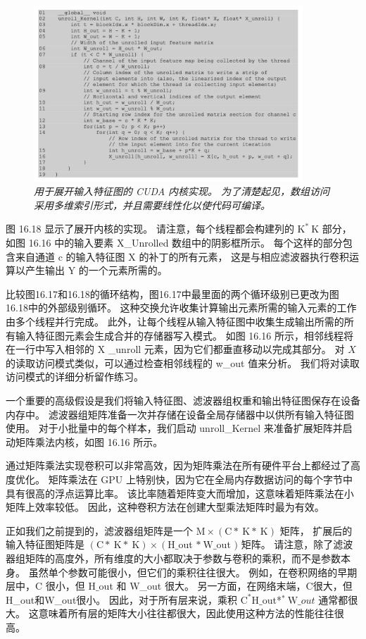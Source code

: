 \begin{figure}[H]
	\centering
	\includegraphics[width=0.9\textwidth]{figs/F16.18.png}
	\caption{\textit{用于展开输入特征图的 CUDA 内核实现。 
	为了清楚起见，数组访问采用多维索引形式，并且需要线性化以使代码可编译。}}
\end{figure}

图 16.18 显示了展开内核的实现。 请注意，每个线程都会构建列的 $\mathrm{K}^{*} \mathrm{~K}$ 部分，
如图 16.16 中的输入要素 X\_Unrolled 数组中的阴影框所示。 
每个这样的部分包含来自通道 $\mathrm{c}$ 的输入特征图 $\mathrm{X}$ 的补丁的所有元素，
这是与相应滤波器执行卷积运算以产生输出 Y 的一个元素所需的。

比较图16.17和16.18的循环结构，图16.17中最里面的两个循环级别已更改为图16.18中的外部级别循环。 
这种交换允许收集计算输出元素所需的输入元素的工作由多个线程并行完成。 
此外，让每个线程从输入特征图中收集生成输出所需的所有输入特征图元素会生成合并的存储器写入模式。 
如图 16.16 所示，相邻线程将在一行中写入相邻的 $\mathrm{X}$ \_unroll 元素，因为它们都垂直移动以完成其部分。 
对 $X$ 的读取访问模式类似，可以通过检查相邻线程的 w\_out 值来分析。 我们将对读取访问模式的详细分析留作练习。

一个重要的高级假设是我们将输入特征图、滤波器组权重和输出特征图保存在设备内存中。 
滤波器组矩阵准备一次并存储在设备全局存储器中以供所有输入特征图使用。 
对于小批量中的每个样本，我们启动 unroll\_Kernel 来准备扩展矩阵并启动矩阵乘法内核，如图 16.16 所示。

通过矩阵乘法实现卷积可以非常高效，因为矩阵乘法在所有硬件平台上都经过了高度优化。 
矩阵乘法在 GPU 上特别快，因为它在全局内存数据访问的每个字节中具有很高的浮点运算比率。 
该比率随着矩阵变大而增加，这意味着矩阵乘法在小矩阵上效率较低。 因此，这种卷积方法在创建大型乘法矩阵时最为有效。

正如我们之前提到的，滤波器组矩阵是一个 $\mathrm{M} \times(\mathrm{C} * \mathrm{~K} * \mathrm{~K})$ 矩阵，
扩展后的输入特征图矩阵是 $(\mathrm{C} * \mathrm{~K} * \mathrm{~K}) \times\left(\mathrm{H} \_\right.$out $* \mathrm{~W} \_ $out $)$ 矩阵。 
请注意，除了滤波器组矩阵的高度外，所有维度的大小都取决于参数与卷积的乘积，而不是参数本身。 
虽然单个参数可能很小，但它们的乘积往往很大。 
例如，在卷积网络的早期层中，$\mathrm{C}$ 很小，但 $\mathrm{H} \_$out 和 W\_out 很大。 
另一方面，在网络末端，$\mathrm{C}$很大，但H\_out和W\_out很小。 
因此，对于所有层来说，乘积 $\mathrm{C}^{*} \mathrm{H} \_$out*${ }^{*} \mathrm{~W} \_o u t$ 通常都很大。 
这意味着所有层的矩阵大小往往都很大，因此使用这种方法的性能往往很高。

